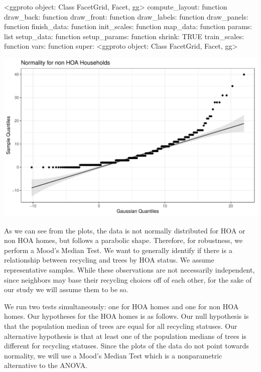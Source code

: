 \documentclass{article}
\begin{document}
\begin{Schunk}
\begin{Soutput}
<ggproto object: Class FacetGrid, Facet, gg>
    compute_layout: function
    draw_back: function
    draw_front: function
    draw_labels: function
    draw_panels: function
    finish_data: function
    init_scales: function
    map_data: function
    params: list
    setup_data: function
    setup_params: function
    shrink: TRUE
    train_scales: function
    vars: function
    super:  <ggproto object: Class FacetGrid, Facet, gg>
\end{Soutput}
\end{Schunk}
\includegraphics{exam22-032}

As we can see from the plots\citep{qqplotr}, the data is not normally distributed for HOA or non HOA homes, but follows a parabolic shape. Therefore, for robustness, we perform a Mood's Median Test\citep{RVAideMemoire}. We want to generally identify if there is a relationship between recycling and trees by HOA status. We assume representative samples. While these observations are not necessarily independent, since neighbors may base their recycling choices off of each other, for the sake of our study we will assume them to be so.

We run two tests simultaneously: one for HOA homes and one for non HOA homes.
Our hypotheses for the HOA homes is as follows. Our null hypothesis is that the population median of trees are equal for all recycling statuses. Our alternative hypothesis is that at least one of the population medians of trees is different for recycling statuses. Since the plots of the data do not point towards normality, we will use a Mood's Median Test which is a nonparametric alternative to the ANOVA.
\end{document}
